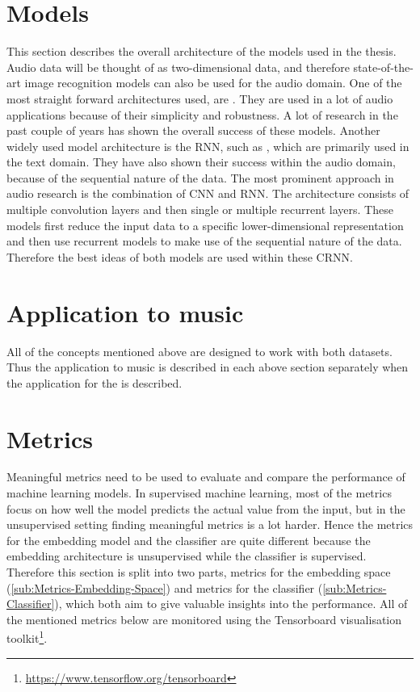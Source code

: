 \section{Models}
\label{sec:Models}
This section describes the overall architecture of the models used in the thesis. Audio data will be thought of as two-dimensional data, and therefore state-of-the-art image recognition models can also be used for the audio domain.
\newline
\newline
One of the most straight forward architectures used, are . They are used in a lot of audio applications because of their simplicity and robustness. A lot of research in the past couple of years has shown the overall success of these models.
\newline
\newline
Another widely used model architecture is the \gls{RNN}, such as , which are primarily used in the text domain. They have also shown their success within the audio domain, because of the sequential nature of the data.
\newline
\newline
The most prominent approach in audio research is the combination of \gls{CNN} and \gls{RNN}. The architecture consists of multiple convolution layers and then single or multiple recurrent layers. These models first reduce the input data to a specific lower-dimensional representation and then use recurrent models to make use of the sequential nature of the data. Therefore the best ideas of both models are used within these \gls{CRNN}.

\section{Application to music}
\label{sec:Application-Music}
All of the concepts mentioned above are designed to work with both datasets. Thus the application to music is described in each above section separately when the application for the  is described.

\section{Metrics}
\label{sec:Metrics}
Meaningful metrics need to be used to evaluate and compare the performance of machine learning models. In supervised machine learning, most of the metrics focus on how well the model predicts the actual value from the input, but in the unsupervised setting finding meaningful metrics is a lot harder. Hence the metrics for the embedding model and the classifier are quite different because the embedding architecture is unsupervised while the classifier is supervised. Therefore this section is split into two parts, metrics for the embedding space (\ref{sub:Metrics-Embedding-Space}) and metrics for the classifier (\ref{sub:Metrics-Classifier}), which both aim to give valuable insights into the performance. All of the mentioned metrics below are monitored using the Tensorboard visualisation toolkit\footnote{\url{https://www.tensorflow.org/tensorboard}}.

